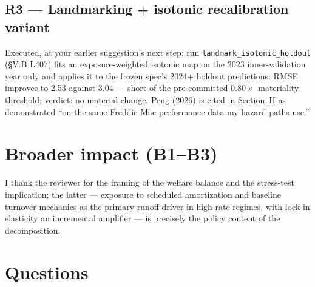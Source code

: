 \documentclass[11pt]{article}
\newcommand{\run}[1]{\texttt{#1}}
\begin{document}
\subsection*{R3 --- Landmarking + isotonic recalibration variant}

Executed, at your earlier suggestion's next step: run
\run{landmark\_isotonic\_holdout} (\S V.B L407) fits an exposure-weighted
isotonic map on the 2023 inner-validation year only and applies it to the
frozen spec's 2024+ holdout predictions: RMSE improves to 2.53 against 3.04
--- short of the pre-committed $0.80\times$ materiality threshold; verdict: no
material change. Peng (2026) is cited in Section~II as demonstrated ``on the
same Freddie Mac performance data my hazard paths use.''

\section*{Broader impact (B1--B3)}

I thank the reviewer for the framing of the welfare balance and the
stress-test implication; the latter --- exposure to scheduled amortization and
baseline turnover mechanics as the primary runoff driver in high-rate regimes,
with lock-in elasticity an incremental amplifier --- is precisely the policy
content of the decomposition.

\section*{Questions}
\end{document}
